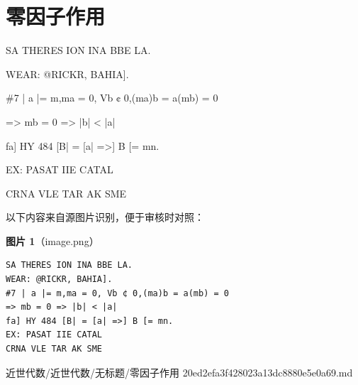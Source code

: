 \section*{零因子作用}

\begin{note}[零因子作用]

SA THERES ION INA BBE LA.

WEAR: @RICKR, BAHIA].

\#7 | a |= m,ma = 0, Vb ¢ 0,(ma)b = a(mb) = 0

=> mb = 0 => |b| < |a|

fa] HY 484 [B| = [a| =>] B [= mn.

EX: PASAT IIE CATAL

CRNA VLE TAR AK SME

\end{note}

\begin{note}
以下内容来自源图片识别，便于审核时对照：

\textbf{图片 1}（image.png）
\begin{Verbatim}[fontsize=\small]
SA THERES ION INA BBE LA.
WEAR: @RICKR, BAHIA].
#7 | a |= m,ma = 0, Vb ¢ 0,(ma)b = a(mb) = 0
=> mb = 0 => |b| < |a|
fa] HY 484 [B| = [a| =>] B [= mn.
EX: PASAT IIE CATAL
CRNA VLE TAR AK SME
\end{Verbatim}

\end{note}

\begin{note}[来源路径]

近世代数/近世代数/无标题/零因子作用 20ed2efa3f428023a13dc8880e5e0a69.md

\end{note}
